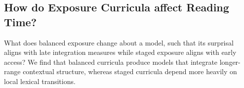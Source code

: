 \documentclass[11pt]{article}
\begin{document}

\subsection{How do Exposure Curricula affect Reading Time?}


What does balanced exposure change about a model, such that its surprisal aligns with late integration measures while staged exposure aligns with early access? We find that  balanced curricula produce models that integrate longer-range contextual structure, whereas staged curricula depend more heavily on local lexical transitions.
\end{document}

